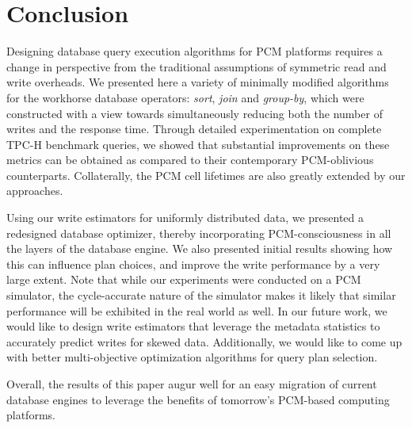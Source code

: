 \section{Conclusion}
\label{conclusion}
Designing database query execution algorithms for PCM platforms requires a
change in perspective from the traditional assumptions of symmetric read
and write overheads.  We presented here a variety of minimally modified algorithms
for the workhorse database operators: \emph{sort}, \emph{join} and
\emph{group-by}, which were constructed with a view towards simultaneously
reducing both the number of writes and the response time. Through detailed
experimentation on complete TPC-H benchmark queries, we showed that
substantial improvements on these metrics can be obtained as compared
to their contemporary PCM-oblivious counterparts.  Collaterally, the
PCM cell lifetimes are also greatly extended by our approaches.

Using our write estimators for uniformly distributed data, we presented a
redesigned database optimizer, thereby incorporating PCM-consciousness in
all the layers of the database engine. We also presented initial results
showing how this can influence plan choices, and improve the write
performance by a very large extent.  Note that while our experiments
were conducted on a PCM simulator, the cycle-accurate nature of the
simulator makes it likely that similar performance will be exhibited in
the real world as well. In our future work, we would like to design
write estimators that leverage the metadata statistics to accurately
predict writes for skewed data. Additionally, we would like to come up with better multi-objective optimization algorithms for query plan selection.

Overall, the results of this paper augur well for an easy migration of
current database engines to leverage the benefits of tomorrow's PCM-based
computing platforms.
